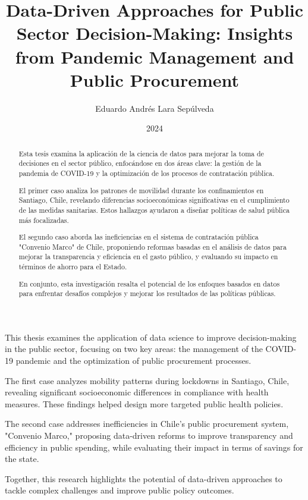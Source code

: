 \documentclass[upright, contnum]{umemoriaENG}
\author{Eduardo Andrés Lara Sepúlveda}
\title{Data-Driven Approaches for Public Sector Decision-Making: Insights from Pandemic Management and Public Procurement}
\date{2024}
\begin{document}
\frontmatter
\maketitle

\begin{abstract}

Esta tesis examina la aplicación de la ciencia de datos para mejorar la toma de decisiones en el sector público, enfocándose en dos áreas clave: la gestión de la pandemia de COVID-19 y la optimización de los procesos de contratación pública.

El primer caso analiza los patrones de movilidad durante los confinamientos en Santiago, Chile, revelando diferencias socioeconómicas significativas en el cumplimiento de las medidas sanitarias. Estos hallazgos ayudaron a diseñar políticas de salud pública más focalizadas.

El segundo caso aborda las ineficiencias en el sistema de contratación pública "Convenio Marco" de Chile, proponiendo reformas basadas en el análisis de datos para mejorar la transparencia y eficiencia en el gasto público, y evaluando su impacto en términos de ahorro para el Estado.

En conjunto, esta investigación resalta el potencial de los enfoques basados en datos para enfrentar desafíos complejos y mejorar los resultados de las políticas públicas.
    
\end{abstract}

\begin{abstractEng}

This thesis examines the application of data science to improve decision-making in the public sector, focusing on two key areas: the management of the COVID-19 pandemic and the optimization of public procurement processes.

The first case analyzes mobility patterns during lockdowns in Santiago, Chile, revealing significant socioeconomic differences in compliance with health measures. These findings helped design more targeted public health policies.

The second case addresses inefficiencies in Chile's public procurement system, "Convenio Marco," proposing data-driven reforms to improve transparency and efficiency in public spending, while evaluating their impact in terms of savings for the state.

Together, this research highlights the potential of data-driven approaches to tackle complex challenges and improve public policy outcomes.
\end{abstractEng} 
\end{document}
